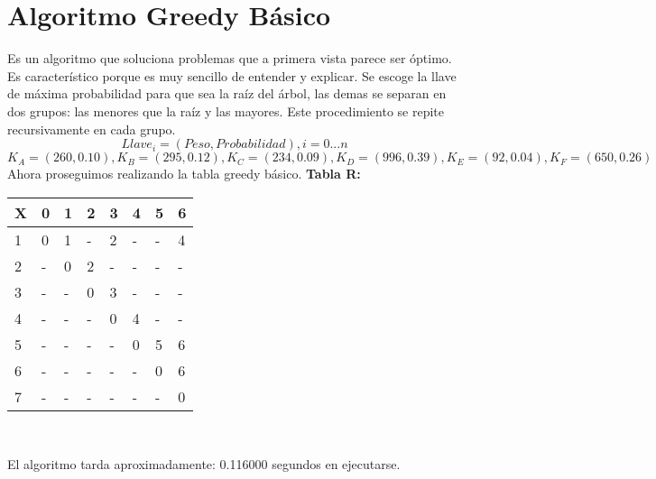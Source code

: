 \documentclass[10pt,letterpaper]{article}
\begin{document}
\section{Algoritmo Greedy Básico} 
        Es un algoritmo que soluciona problemas que a primera vista parece ser 
        óptimo. Es característico porque es muy sencillo de entender y explicar. 
        Se escoge la llave de máxima probabilidad para que sea la raíz del árbol, las 
        demas se separan en dos grupos: las menores que la raíz y las mayores. Este 
        procedimiento se repite recursivamente en cada grupo. 
        \[ Llave_{i} = (Peso, Probabilidad), i = 0...n \]
\[ K_{A} = (260, 0.10), K_{B} = (295, 0.12), K_{C} = (234, 0.09), K_{D} = (996, 0.39), K_{E} = (92, 0.04), K_{F} = (650, 0.26) \]
\newline Ahora proseguimos realizando la tabla greedy básico.
\textbf{Tabla R: }
\begin{center}
\begin{tabu} to 1.0\textwidth { | l | l | l | l | l | l | l | l | }
\hline
{}\color{black}\textbf{X} & \color{black}\textbf{0} & \color{black}\textbf{1} & \color{black}\textbf{2} & \color{black}\textbf{3} & \color{black}\textbf{4} & \color{black}\textbf{5} & \color{black}\textbf{6} \\ 
\hline
{}\color{black}1 &  0  &  1  &  -  &  2  &  -  &  -  &  4  \\ 
\hline
{}\color{black}2 &  -  &  0  &  2  &  -  &  -  &  -  &  -  \\ 
\hline
{}\color{black}3 &  -  &  -  &  0  &  3  &  -  &  -  &  -  \\ 
\hline
{}\color{black}4 &  -  &  -  &  -  &  0  &  4  &  -  &  -  \\ 
\hline
{}\color{black}5 &  -  &  -  &  -  &  -  &  0  &  5  &  6  \\ 
\hline
{}\color{black}6 &  -  &  -  &  -  &  -  &  -  &  0  &  6  \\ 
\hline
{}\color{black}7 &  -  &  -  &  -  &  -  &  -  &  -  &  0  \\ 
\hline
\end{tabu} \\
\end{center}
El algoritmo tarda aproximadamente: 0.116000 segundos en ejecutarse.
\end{document}
